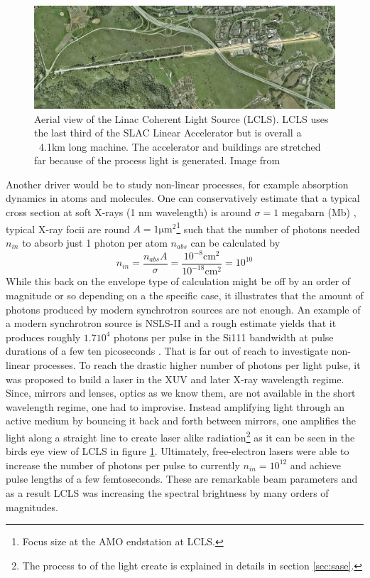 \begin{figure}[t]
	\centering
		\includegraphics[width=1.00\textwidth]{images/aerial-view-lcls.jpg}
	\caption{Aerial view of the Linac Coherent Light Source (LCLS). LCLS uses the last third of the SLAC Linear Accelerator but is overall a ~4.1km long machine. The accelerator and buildings are stretched far because of the process light is generated. Image from \cite{SLAC-2009-Flickr}}
	\label{fig:aerial-view-lcls}
\end{figure}
Another driver would be to study non-linear processes, for example absorption dynamics in atoms and molecules. One can conservatively estimate that a typical cross section at soft X-rays (1 nm wavelength) is around $\sigma = 1$ megabarn (Mb) \cite{Bucksbaum-2011-Book}, typical X-ray focii are round $A = 1 \mathrm{\mu m}^{2}$\footnote{Focus size at the AMO endstation at LCLS.} such that the number of photons needed $n_{in}$ to absorb just 1 photon per atom $n_{abs}$ can be calculated by
\begin{equation}
n_{in} = \frac{n_{abs} A}{\sigma} = \frac{10^{-8} \mathrm{cm}^{2}}{10^{-18} \mathrm{cm}^{2}}=10^{10}
\end{equation}
While this back on the envelope type of calculation might be off by an order of magnitude or so depending on a the specific case, it illustrates that the amount of photons produced by modern synchrotron sources are not enough. An example of a modern synchrotron source is NSLS-II and a rough estimate yields that it produces roughly $1.7 10^{4}$ photons per pulse in the Si111 bandwidth at pulse durations of a few ten picoseconds \cite{Williams-2016-PC}. That is far out of reach to investigate non-linear processes. To reach the drastic higher number of photons per light pulse, it was proposed to build a laser in the XUV and later X-ray wavelength regime. Since, mirrors and lenses, optics as we know them, are not available in the short wavelength regime, one had to improvise. Instead amplifying light through an active medium by bouncing it back and forth between mirrors, one amplifies the light along a straight line to create laser alike radiation\footnote{The process to of the light create is explained in details in section \ref{sec:sase}.} as it can be seen in the birds eye view of LCLS in figure \ref{fig:aerial-view-lcls}. Ultimately, free-electron lasers were able to increase the number of photons per pulse to currently $n_{in} = 10^{12}$ and achieve pulse lengths of a few femtoseconds. These are remarkable beam parameters and as a result LCLS was increasing the spectral brightness by many orders of magnitudes.
